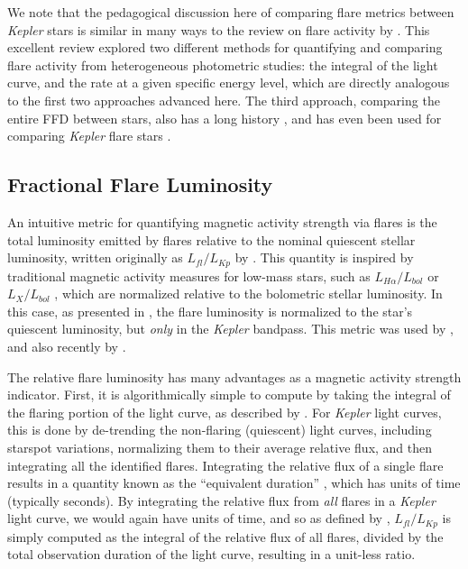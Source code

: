 \documentclass[preprint2]{aastex62}
\newcommand{\Kepler}{\textsl{Kepler}\xspace}
\begin{document}
We note that the pedagogical discussion here of comparing flare metrics between \Kepler stars is similar in many ways to the review on flare activity by \citet{kunkel1975}. This excellent review explored two different methods for quantifying and comparing flare activity from heterogeneous photometric studies: the integral of the light curve, and the rate at a given specific energy level, which are directly analogous to the first two approaches advanced here. The third approach, comparing the entire FFD between stars, also has a long history \citep[e.g. see Fig. 17 of][]{lme1976}, and has even been used for comparing \Kepler flare stars \citep[e.g.][]{ramsay2013,hawley2014}.




\subsection{Fractional Flare Luminosity}
\label{sec:fracL}

An intuitive metric for quantifying magnetic activity strength via flares is the total luminosity emitted by flares relative to the nominal quiescent stellar luminosity, written originally as $L_{fl}/L_{Kp}$ by \citet{lurie2015}. This quantity is inspired by traditional magnetic activity measures for low-mass stars, such as $L_{H\alpha}/L_{bol}$  \citep{walkowicz2004} or $L_X/L_{bol}$ \citep{pallavicini1981}, which are normalized relative to the bolometric stellar luminosity. In this case, as presented in \citet{lurie2015}, the flare luminosity is normalized to the star's quiescent luminosity, but {\it only} in the \Kepler bandpass. This metric was used by \citet{davenport2016}, and also recently by \citet{yang2017}.


The relative flare luminosity has many advantages as a magnetic activity strength indicator. First, it is algorithmically simple to compute by taking the integral of the flaring portion of the light curve, as described by \citet{kunkel1975}. For \Kepler light curves, this is done by de-trending the non-flaring (quiescent) light curves, including starspot variations, normalizing them to their average relative flux, and then integrating all the identified flares. Integrating the relative flux of a single flare results in a quantity known as the ``equivalent duration'' \citep[e.g. see][]{huntwalker2012}, which has units of time (typically seconds). By integrating the relative flux from {\it all} flares in a \Kepler light curve, we would again have units of time, and so as defined by \citet{lurie2015}, $L_{fl}/L_{Kp}$ is simply computed as the integral of the relative flux of all flares, divided by the total observation duration of the light curve, resulting in a unit-less ratio.
\end{document}
